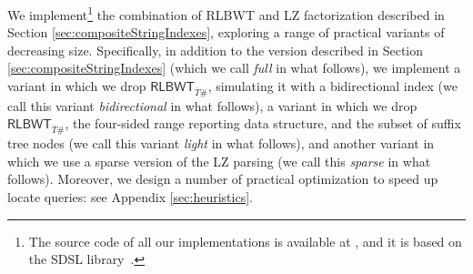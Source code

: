\documentclass[a4paper,UKenglish]{lipics-v2016}
\newcommand{\REV}[1]{\ensuremath{\overline{#1}}}
\newcommand{\RLBWT}{\ensuremath{\mathsf{RLBWT}}}
\begin{document}
We implement\footnote{The source code of all our implementations is available at \cite{githubNicola1,githubNicola2}, and it is based on the SDSL library~\cite{gbmp2014sea}.} the combination of RLBWT and LZ factorization described in Section \ref{sec:compositeStringIndexes}, exploring a range of practical variants of decreasing size. Specifically, in addition to the version described in Section \ref{sec:compositeStringIndexes} (which we call \emph{full} in what follows), we implement a variant in which we drop $\RLBWT_{\REV{T}\#}$, simulating it with a bidirectional index (we call this variant \emph{bidirectional} in what follows), a variant in which we drop $\RLBWT_{\REV{T}\#}$, the four-sided range reporting data structure, and the subset of suffix tree nodes (we call this variant \emph{light} in what follows), and another variant in which we use a sparse version of the LZ parsing (we call this \emph{sparse} in what follows). Moreover, we design a number of practical optimization to speed up locate queries: see Appendix \ref{sec:heuristics}.
\end{document}
